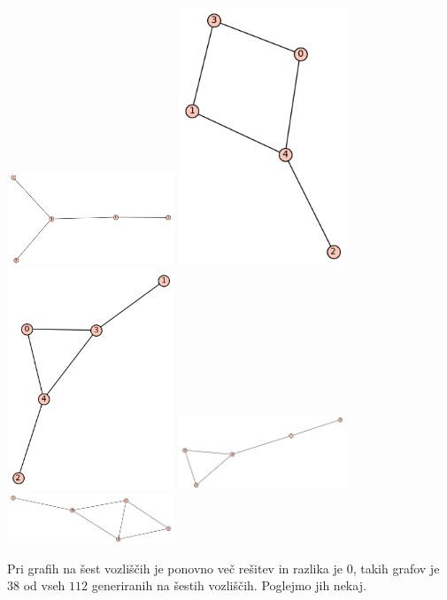 \documentclass[10pt, a4paper]{article}
\begin{document}
\includegraphics[width=5cm]{min_graf_5.1_vozlisca}
\includegraphics[width=5cm]{min_graf_5.2_vozlisca}
\includegraphics[width=5cm]{min_graf_5.3_vozlisca}
\includegraphics[width=5cm]{min_graf_5.4_vozlisca}
\includegraphics[width=5cm]{min_graf_5.5_vozlisca}

Pri grafih na šest vozliščih je ponovno več rešitev in razlika je $0$, takih grafov je $38$ od vseh $112$ generiranih na šestih vozliščih. Poglejmo jih nekaj.
\end{document}
